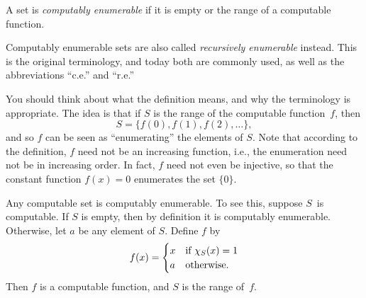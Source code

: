 \documentclass[../../../include/open-logic-section]{subfiles}
\begin{document}

\begin{defn}
A set is \emph{computably enumerable} if it is empty or the range of a
computable function.
\end{defn}

\begin{history}
Computably enumerable sets are also called \emph{recursively
  enumerable} instead. This is the original terminology, and today
both are commonly used, as well as the abbreviations ``c.e.'' and
``r.e.''
\end{history}

\begin{explain}
You should think about what the definition means, and why the
terminology is appropriate. The idea is that if $S$ is the range of
the computable function~$f$, then
\[
S = \{ f(0), f(1), f(2), \dots \},
\]
and so $f$ can be seen as ``enumerating'' the elements of $S$. Note
that according to the definition, $f$ need not be an increasing
function, i.e., the enumeration need not be in increasing order. In
fact, $f$ need not even be injective, so that the constant function
$f(x) = 0$ enumerates the set $\{ 0 \}$.
\end{explain}

Any computable set is computably enumerable. To see this, suppose
$S$~is computable. If $S$ is empty, then by definition it is
computably enumerable. Otherwise, let $a$ be any element of
$S$. Define $f$ by
\[
f(x) =
\begin{cases}
x & \text{if $\chi_{S}(x) = 1$} \\
a & \text{otherwise.}
\end{cases}
\]
Then $f$ is a computable function, and $S$ is the range of~$f$.
\end{document}
